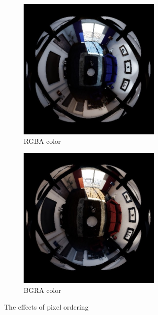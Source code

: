 \begin{figure}[!htb]
    \centering
    \begin{subfigure}{0.45\textwidth}
        \centering
        \includegraphics[height=7cm]{rapport/fig/Results/wrongcolor.jpeg}
        \caption{RGBA color}
        \label{fig:res_wrong_color}
    \end{subfigure}
    \begin{subfigure}{0.45\textwidth}
        \centering
        \includegraphics[height=7cm]{rapport/fig/Results/rightcolor.jpeg}
        \caption{BGRA color}
        \label{fig:res_rigth_color}
    \end{subfigure}
    \caption{The effects of pixel ordering}
    \label{fig:res_RGBA_BGRA}
\end{figure}

